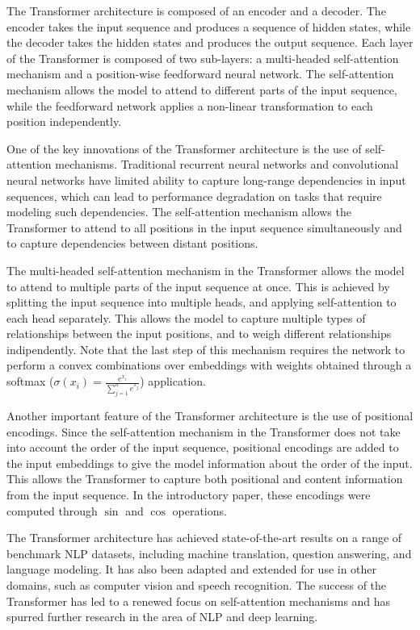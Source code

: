 \documentclass{article}
\begin{document}
The Transformer architecture is composed of an encoder and a decoder. The encoder takes the input sequence and produces a sequence of hidden states, while the decoder takes the hidden states and produces the output sequence. Each layer of the Transformer is composed of two sub-layers: a multi-headed self-attention mechanism and a position-wise feedforward neural network. The self-attention mechanism allows the model to attend to different parts of the input sequence, while the feedforward network applies a non-linear transformation to each position independently.

One of the key innovations of the Transformer architecture is the use of self-attention mechanisms. Traditional recurrent neural networks and convolutional neural networks have limited ability to capture long-range dependencies in input sequences, which can lead to performance degradation on tasks that require modeling such dependencies. The self-attention mechanism allows the Transformer to attend to all positions in the input sequence simultaneously and to capture dependencies between distant positions.

The multi-headed self-attention mechanism in the Transformer allows the model to attend to multiple parts of the input sequence at once. This is achieved by splitting the input sequence into multiple heads, and applying self-attention to each head separately. This allows the model to capture multiple types of relationships between the input positions, and to weigh different relationships indipendently. Note that the last step of this mechanism requires the network to perform a convex combinations over embeddings with weights obtained through a softmax ($\sigma(x_i) = \frac{e^{x_i}}{\sum_{j=1}^{n} e^{x_j}}$) application.

Another important feature of the Transformer architecture is the use of positional encodings. Since the self-attention mechanism in the Transformer does not take into account the order of the input sequence, positional encodings are added to the input embeddings to give the model information about the order of the input. This allows the Transformer to capture both positional and content information from the input sequence. In the introductory paper, these encodings were computed through $\sin$ and $\cos$ operations.

The Transformer architecture has achieved state-of-the-art results on a range of benchmark NLP datasets, including machine translation, question answering, and language modeling. It has also been adapted and extended for use in other domains, such as computer vision and speech recognition. The success of the Transformer has led to a renewed focus on self-attention mechanisms and has spurred further research in the area of NLP and deep learning.
\end{document}
